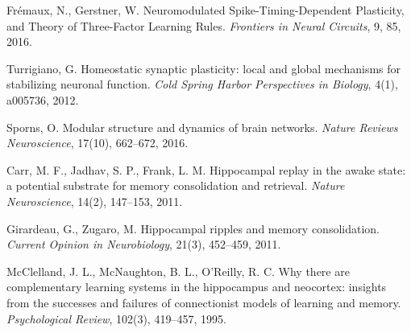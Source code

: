 \documentclass[11pt]{article}
\begin{document}
\begin{thebibliography}{99}
Frémaux, N., Gerstner, W.
\newblock Neuromodulated Spike-Timing-Dependent Plasticity, and Theory of Three-Factor Learning Rules.
\newblock \emph{Frontiers in Neural Circuits}, 9, 85, 2016.

Turrigiano, G.
\newblock Homeostatic synaptic plasticity: local and global mechanisms for stabilizing neuronal function.
\newblock \emph{Cold Spring Harbor Perspectives in Biology}, 4(1), a005736, 2012.

Sporns, O.
\newblock Modular structure and dynamics of brain networks.
\newblock \emph{Nature Reviews Neuroscience}, 17(10), 662–672, 2016.

Carr, M. F., Jadhav, S. P., Frank, L. M.
\newblock Hippocampal replay in the awake state: a potential substrate for memory consolidation and retrieval.
\newblock \emph{Nature Neuroscience}, 14(2), 147–153, 2011.

Girardeau, G., Zugaro, M.
\newblock Hippocampal ripples and memory consolidation.
\newblock \emph{Current Opinion in Neurobiology}, 21(3), 452–459, 2011.

McClelland, J. L., McNaughton, B. L., O'Reilly, R. C.
\newblock Why there are complementary learning systems in the hippocampus and neocortex: insights from the successes and failures of connectionist models of learning and memory.
\newblock \emph{Psychological Review}, 102(3), 419–457, 1995.

\end{thebibliography}
\end{document}
